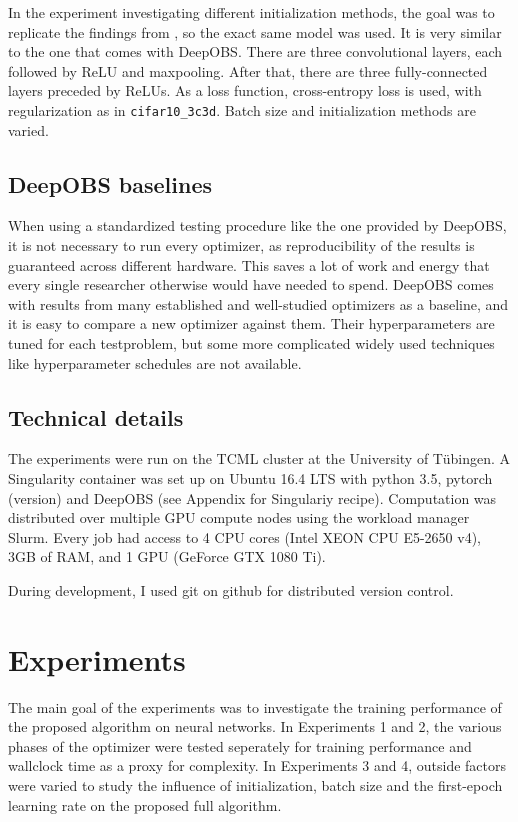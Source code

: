 \documentclass[twoside,12pt,a4paper]{report}
\begin{document}
In the experiment investigating different initialization methods, the goal was to replicate the findings from \cite{roos2019active}, so the exact same model was used. It is very similar to the one that comes with DeepOBS. There are three convolutional layers, each followed by ReLU and maxpooling. After that, there are three fully-connected layers preceded by ReLUs. As a loss function, cross-entropy loss is used, with regularization as in \verb|cifar10_3c3d|.
Batch size and initialization methods are varied.


\section{DeepOBS baselines}
When using a standardized testing procedure like the one provided by DeepOBS, it is not necessary to run every optimizer, as reproducibility of the results is guaranteed across different hardware. This saves a lot of work and energy that every single researcher otherwise would have needed to spend.
DeepOBS comes with results from many established and well-studied optimizers as a baseline, and it is easy to compare a new optimizer against them. Their hyperparameters are tuned for each testproblem, but some more complicated widely used techniques like hyperparameter schedules are not available.

\section{Technical details}
The experiments were run on the TCML cluster at the University of Tübingen.
A Singularity container was set up on Ubuntu 16.4 LTS with python 3.5, pytorch (version) and DeepOBS (see Appendix for Singulariy recipe).
Computation was distributed over multiple GPU compute nodes using the workload manager Slurm. Every job had access to 4 CPU cores (Intel XEON CPU E5-2650 v4), 3GB of RAM, and 1 GPU (GeForce GTX 1080 Ti).

During development, I used git on github for distributed version control.

\chapter{Experiments}
The main goal of the experiments was to investigate the training performance of the proposed algorithm on neural networks.
In Experiments 1 and 2, the various phases of the optimizer were tested seperately for training performance and wallclock time as a proxy for complexity.
In Experiments 3 and 4, outside factors were varied to study the influence of initialization, batch size and the first-epoch learning rate on the proposed full algorithm.
\end{document}

